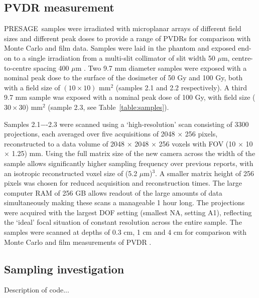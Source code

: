 	\subsection{PVDR measurement}
	PRESAGE\textregistered \ samples were irradiated with microplanar arrays of different field sizes and different peak doses to provide a range of PVDRs for comparison with Monte Carlo and film data. Samples were laid in the phantom and exposed end-on to a single irradiation from a multi-slit collimator of slit width 50 $\mu$m, centre-to-centre spacing 400 $\mu$m \cite{brauer2009new}. Two 9.7 mm diameter samples were exposed with a nominal peak dose to the surface of the dosimeter of 50 Gy and 100 Gy, both with a field size of $(10 \times 10)$ mm$^2$ (samples 2.1 and 2.2 respectively). A third 9.7 mm sample was exposed with a nominal peak dose of 100 Gy, with field size ($30 \times 30$) mm$^2$ (sample 2.3, see Table~\ref{table:samples}). 
	
	Samples 2.1−-2.3 were scanned using a `high-resolution' scan consisting of 3300 projections, each averaged over five acquisitions of 2048 $\times$ 256 pixels, reconstructed to a data volume of 2048 $\times$ 2048 $\times$ 256 voxels with FOV (10 $\times$ 10 $\times$ 1.25) mm. Using the full matrix size of the new camera across the width of the sample allows significantly higher sampling frequency over previous reports, with an isotropic reconstructed voxel size of (5.2 $\mu$m)$^3$. A smaller matrix height of 256 pixels was chosen for reduced acquisition and reconstruction times. The large computer RAM of 256 GB allows readout of the large amounts of data simultaneously making these scans a manageable 1 hour long. The projections were acquired with the largest DOF setting (smallest NA, setting A1), reflecting the `ideal' focal situation of constant resolution across the entire sample. The samples were scanned at depths of 0.3 cm, 1 cm and 4 cm for comparison with Monte Carlo and film measurements of PVDR \cite{martinez-roviradevelopment2012}. 
	
	
	\subsection{Sampling investigation}
	Description of code...

	
